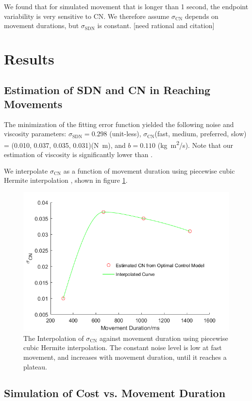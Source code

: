 We found that for simulated movement that is longer than 1 second, the endpoint variability is very sensitive to CN.
We therefore assume $\sigma_{\text{CN}}$ depends on movement durations, but $\sigma_{\text{SDN}}$ is constant. [need rational and citation] 

\section{Results}

\subsection{Estimation of SDN and CN in Reaching Movements}

The minimization of the fitting error function yielded the following noise and viscosity parameters: $\sigma_{\text{SDN}} = 0.298$ (unit-less), $\sigma_{\text{CN}}$(fast, medium, preferred, slow) = (0.010, 0.037, 0.035, 0.031)(\si{N.m}), and $b=0.110$ (\si{kg.m^2/s}). 
Note that our estimation of viscosity is significantly lower than \cite{VanBeers2004}. 

We interpolate $\sigma_{\text{CN}}$ as a function of movement duration using piecewise cubic Hermite interpolation \cite{Fritsch1980}, shown in figure \ref{fig:interpcn}.

\begin{figure}
	\centering
	\includegraphics[width=0.75\linewidth]{figures/interpCN}
	\caption[Interpolation of $\sigma_{\text{CN}}$]{The Interpolation of $\sigma_{\text{CN}}$ against movement duration using piecewise cubic Hermite interpolation. The constant noise level is low at fast movement, and increases with movement duration, until it reaches a plateau.}
	\label{fig:interpcn}
\end{figure}


\subsection{Simulation of Cost vs. Movement Duration}

